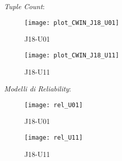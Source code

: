 \textit{Tuple Count}:

\begin{minipage}{\linewidth}
  \begin{minipage}{\linewidth}
    \begin{figure}[H]
      \texttt{[image: plot\_CWIN\_J18\_U01]}
      \caption*{J18-U01}
    \end{figure}
  \end{minipage}
  \begin{minipage}{\linewidth}
    \begin{figure}[H]
      \texttt{[image: plot\_CWIN\_J18\_U11]}
      \caption*{J18-U11}
    \end{figure}
  \end{minipage}
\end{minipage}

\clearpage

\textit{Modelli di Reliability}:

\begin{minipage}{\linewidth}
  \centering
  \begin{minipage}{.7\linewidth}
    \begin{figure}[H]
      \texttt{[image: rel\_U01]}
      \caption*{J18-U01}
    \end{figure}
  \end{minipage}

  \begin{minipage}{.7\linewidth}
    \begin{figure}[H]
      \texttt{[image: rel\_U11]}
      \caption*{J18-U11}
    \end{figure}
  \end{minipage}
\end{minipage}
